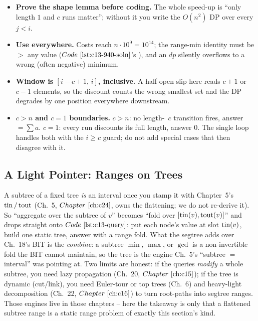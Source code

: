 \begin{hardeningbox}
\begin{itemize}[nosep,leftmargin=1.4em]
  \item \textbf{Prove the shape lemma before coding.}  The whole speed-up is
        ``only length \(1\) and \(c\) runs matter''; without it you write the
        \(O(n^2)\) DP over every \(j<i\).
  \item \textbf{Use  everywhere.}  Costs reach \(n\cdot10^9=10^{14}\);
        the range-min identity must be \(>\!\) any value (\(\coderef{c13-940-soln}\)'s
        ), and an  \(\mathit{dp}\) silently overflows to a wrong
        (often negative) minimum.
  \item \textbf{Window is \([i{-}c{+}1,\,i]\), inclusive.}  A half-open slip here
        reads \(c{+}1\) or \(c{-}1\) elements, so the discount counts the wrong
        smallest set and the DP degrades by one position everywhere downstream.
  \item \textbf{\(c>n\) and \(c=1\) boundaries.}  \(c>n\): no length-~\(c\) transition
        fires, answer \(=\sum a\).  \(c=1\): every run discounts its full length,
        answer \(0\).  The single loop handles both with the \(i\ge c\) guard; do
        not add special cases that then disagree with it.
\end{itemize}
\end{hardeningbox}

\subsection{A Light Pointer: Ranges on Trees}

A subtree of a fixed tree \emph{is} an interval once you stamp it with Chapter~5's
\(\operatorname{tin}/\operatorname{tout}\) (Ch.~5, \(\chref{c24}\), owns the flattening; we do not re-derive
it).  So ``aggregate over the subtree of \(v\)'' becomes ``fold over
\([\operatorname{tin}(v),\operatorname{tout}(v)]\)'' and drops straight onto \(\coderef{c13-query}\): put each
node's value at slot \(\operatorname{tin}(v)\), build one static tree, answer with a range fold.
What the segtree adds over Ch.~18's BIT is the \emph{combine}: a subtree \(\min\),
\(\max\), or \(\gcd\) is a non-invertible fold the BIT cannot maintain, so the tree
is the engine Ch.~5's ``subtree \(=\) interval'' was pointing at.  Two limits are
honest: if the queries \emph{modify} a whole subtree, you need lazy propagation
(Ch.~20, \(\chref{c15}\)); if the tree is dynamic (cut/link), you need
Euler-tour or top trees (Ch.~6) and heavy-light decomposition
(Ch.~22, \(\chref{c16}\)) to turn root-paths into segtree ranges.  Those engines
live in those chapters -- here the takeaway is only that a flattened subtree range
is a static range problem of exactly this section's kind.

